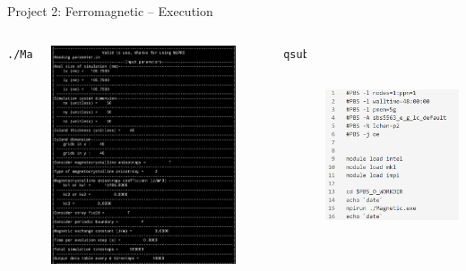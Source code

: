 \documentclass[11pt,aspectratio=169]{beamer}
\begin{document}
\begin{frame}[fragile]{Project 2: Ferromagnetic -- Execution}
\begin{columns}
\centering
\begin{lstlisting}[language=bash]
./Magnetic.exe
\end{lstlisting}
\includegraphics[height=0.85\textwidth]{img/magn_run.png}
\centering
\begin{lstlisting}[language=bash]
qsub magn.pbs
\end{lstlisting}
\includegraphics[height=0.85\textwidth]{img/magn_pbs.png}
\end{columns}
\end{frame}
\end{document}
